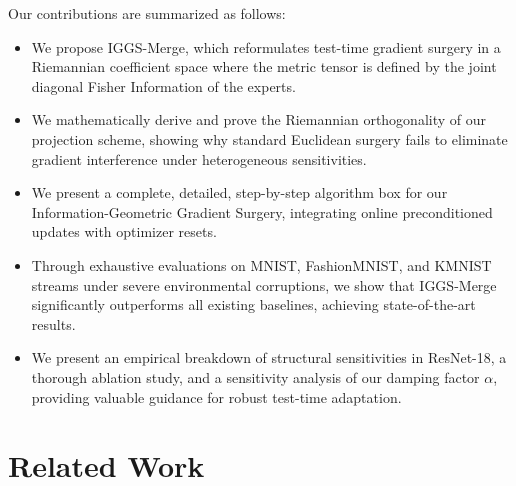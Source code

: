 \documentclass{article}
\theoremstyle{plain}
\theoremstyle{definition}
\theoremstyle{remark}
\begin{document}
Our contributions are summarized as follows:
\begin{itemize}
    \item We propose IGGS-Merge, which reformulates test-time gradient surgery in a Riemannian coefficient space where the metric tensor is defined by the joint diagonal Fisher Information of the experts.
    \item We mathematically derive and prove the Riemannian orthogonality of our projection scheme, showing why standard Euclidean surgery fails to eliminate gradient interference under heterogeneous sensitivities.
    \item We present a complete, detailed, step-by-step algorithm box for our Information-Geometric Gradient Surgery, integrating online preconditioned updates with optimizer resets.
    \item Through exhaustive evaluations on MNIST, FashionMNIST, and KMNIST streams under severe environmental corruptions, we show that IGGS-Merge significantly outperforms all existing baselines, achieving state-of-the-art results.
    \item We present an empirical breakdown of structural sensitivities in ResNet-18, a thorough ablation study, and a sensitivity analysis of our damping factor $\alpha$, providing valuable guidance for robust test-time adaptation.
\end{itemize}

\section{Related Work}
\end{document}
